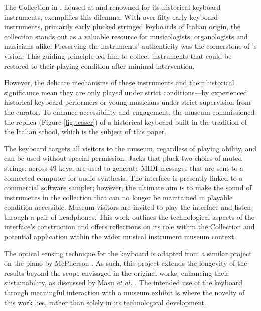 The  Collection in , housed at  and renowned for its historical keyboard instruments, exemplifies this dilemma. With over fifty early keyboard instruments, primarily early plucked stringed keyboards of Italian origin, the collection stands out as a valuable resource for musicologists, organologists and musicians alike. Preserving the instruments' authenticity was the cornerstone of ’s vision. This guiding principle led him to collect instruments that could be restored to their playing condition after minimal intervention. 

However, the delicate mechanisms of these instruments and their historical significance mean they are only played under strict conditions—by experienced historical keyboard performers or young musicians under strict supervision from the curator. 
To enhance accessibility and engagement, the museum commissioned the replica (Figure \ref{fig:teaser}) of a historical keyboard built in the tradition of the Italian school, which is the subject of this paper.

The keyboard targets all visitors to the museum, regardless of playing ability, and can be used without special permission.
Jacks that pluck two choirs of muted strings, across 49-keys, are used to generate MIDI messages that are sent to a connected computer for audio synthesis. 
The interface is presently linked to a commercial software sampler; however, the ultimate aim is to make the sound of instruments in the collection that can no longer be maintained in playable condition accessible. Museum visitors are invited to play the interface and listen through a pair of headphones. This work outlines the technological aspects of the interface's construction and offers reflections on its role within the  Collection and potential application within the wider musical instrument museum context. 

The optical sensing technique for the keyboard is adapted from a similar project on the piano by McPherson \cite{mcpherson_portable_2013}. As such, this project extends the longevity of the results beyond the scope envisaged in the original works, enhancing their sustainability, as discussed by Masu \emph{et al.} \cite{masu_the-o-in-nime:_2023}. The intended use of the keyboard through meaningful interaction with a museum exhibit is where the novelty of this work lies, rather than solely in its technological development. 

